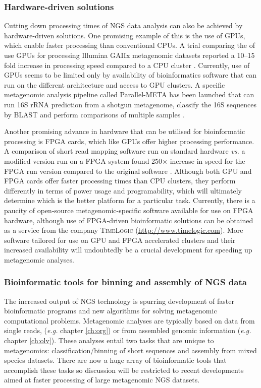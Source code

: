 \subsubsection{Hardware-driven solutions}
Cutting down processing times of \ac{NGS} data analysis can also be achieved by hardware-driven solutions.
One promising example of this is the use of \acp{GPU}, which enable faster processing than conventional \acp{CPU}.
A trial comparing the of use \acp{GPU} for processing Illumina GAIIx metagenomic datasets reported a 10--15 fold increase in processing speed compared to a \ac{CPU} cluster \cite{Su2012}.
Currently, use of \acp{GPU} seems to be limited only by availability of bioinformatics software that can run on the different architecture and access to \ac{GPU} clusters.
A specific metagenomic analysis pipeline called Parallel-META has been launched that can run 16S \acs{rRNA} prediction from a shotgun metagenome, classify the 16S sequences by \acs{BLAST} and perform comparisons of multiple samples \cite{Su2012}.

Another promising advance in hardware that can be utilised for bioinformatic processing is \ac{FPGA} cards, which like \acp{GPU} offer higher processing performance.
A comparison of short read mapping software run on standard hardware \emph{vs.} a modified version run on a \ac{FPGA} system found 250$\times$ increase in speed for the \ac{FPGA} run version compared to the original software \cite{Olson2012}.
Although both \ac{GPU} and \ac{FPGA} cards offer faster processing times than \ac{CPU} clusters, they perform differently in terms of power usage and programability, which will ultimately determine which is the better platform for a particular task.
Currently, there is a paucity of open-source metagenomic-specific software available for use on \ac{FPGA} hardware, although use of \ac{FPGA}-driven bioinformatic solutions can be obtained as a service from the company \textsc{TimeLogic} 
(\url{http://www.timelogic.com}).
More software tailored for use on \ac{GPU} and \ac{FPGA} accelerated clusters and their increased availability will undoubtedly be a crucial development for speeding up metagenomic analyses.

\subsubsection{Bioinformatic tools for binning and assembly of \acs{NGS} data}
The increased output of \ac{NGS} technology is spurring development of faster bioinformatic programs and new algorithms for solving metagenomic computational problems.
Metagenomic analyses are typically based on data from single reads, (\emph{e.g.} chapter \ref{ch:org}) or from assembled genomic information (\emph{e.g.} chapter \ref{ch:olv}).
These analyses entail two tasks that are unique to metagenomics: classification/binning of short sequences and assembly from mixed species datasets. 
There are now a huge array of bioinformatic tools that accomplish these tasks so discussion will be restricted to recent developments aimed at faster processing of large metagenomic \ac{NGS} datasets.

